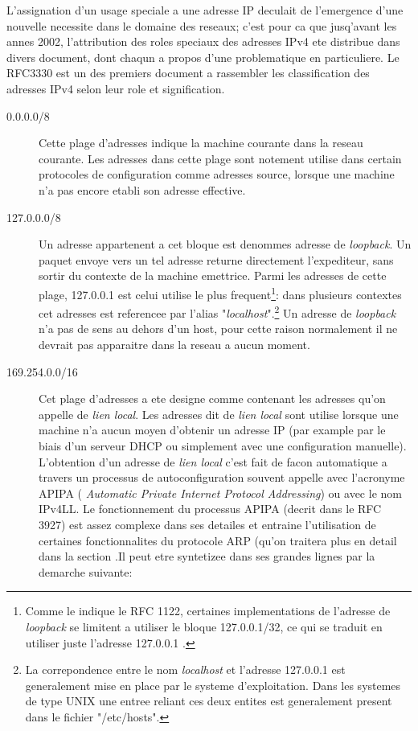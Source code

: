 L'assignation d'un usage speciale a une adresse IP deculait de l'emergence
d'une nouvelle necessite dans le domaine des reseaux; c'est pour
ca que jusq'avant les annes 2002, l'attribution des roles speciaux des adresses
IPv4 ete distribue dans divers document, dont chaqun a propos d'une
problematique en particuliere. Le RFC3330 est un des premiers document a
rassembler les classification des adresses IPv4 selon leur role et signification.



\begin{description}
\item[0.0.0.0/8]
Cette plage d'adresses indique la machine courante dans la reseau courante.
Les adresses dans cette plage sont notement utilise dans certain protocoles de
configuration comme adresses source, lorsque une machine n'a pas encore etabli
son adresse effective.

\item[127.0.0.0/8]
Un adresse appartenent a cet bloque est denommes adresse de {\it loopback}.  Un
paquet envoye vers un tel adresse returne directement l'expediteur, sans sortir
du contexte de la machine emettrice. Parmi les adresses de cette plage,
127.0.0.1 est celui utilise le plus frequent\footnote{Comme le indique
le RFC 1122, certaines implementations de l'adresse de {\it loopback} se
limitent a utiliser le bloque 127.0.0.1/32, ce qui se traduit en utiliser juste
l'adresse 127.0.0.1 .}: dans plusieurs contextes cet adresses est referencee par
l'alias "{\it localhost}".\footnote{La correpondence entre le nom {\it localhost} et
l'adresse 127.0.0.1 est generalement mise en place par le systeme d'exploitation.
Dans les systemes de type UNIX une entree reliant ces deux entites est generalement
present dans le fichier "/etc/hosts".}
Un adresse de {\it loopback} n'a pas de sens au dehors
d'un host, pour cette raison normalement il ne devrait pas apparaitre dans la
reseau a aucun moment.


\item[169.254.0.0/16]
Cet plage d'adresses a ete designe comme contenant les adresses qu'on appelle
de {\it lien local}.  Les adresses dit de {\it lien local} sont utilise lorsque
une machine n'a aucun moyen d'obtenir un adresse IP (par example par le biais
d'un serveur DHCP ou simplement avec une configuration manuelle).  L'obtention
d'un adresse de {\it lien local} c'est fait de facon automatique a travers un
processus de autoconfiguration souvent appelle avec l'acronyme APIPA ({\it
Automatic Private Internet Protocol Addressing}) ou avec le nom IPv4LL.  Le
fonctionnement du processus APIPA (decrit dans le RFC 3927) est assez complexe
dans ses detailes et entraine l'utilisation de certaines fonctionnalites du
protocole ARP (qu'on traitera plus en detail dans la section %
.Il peut etre syntetizee dans ses grandes lignes par la demarche suivante:


\end{description}
